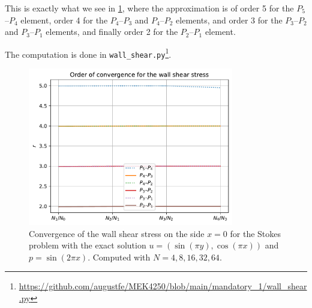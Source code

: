 \begin{solution}{6.7}
    This is exactly what we see in \cref{fig:wall_shear_stress}, where the approximation is of order 5 for the $P_5$--$P_4$ element, order 4 for the $P_4$--$P_3$ and $P_4$--$P_2$ elements, and order 3 for the $P_3$--$P_2$ and $P_3$--$P_1$ elements, and finally order 2 for the $P_2$--$P_1$ element.

    The computation is done in \texttt{wall\_shear.py}\footnote{\url{https://github.com/augustfe/MEK4250/blob/main/mandatory_1/wall_shear.py}}.

    \begin{figure}[htbp]
        \centering
        \includegraphics[width=0.8\textwidth]{wall_shear.pdf}
        \caption{Convergence of the wall shear stress on the side $x = 0$ for the Stokes problem with the exact solution $u = (\sin(\pi y), \cos(\pi x))$ and $p = \sin(2 \pi x)$. Computed with $N = 4, 8, 16, 32, 64$.\label{fig:wall_shear_stress}}
    \end{figure}
\end{solution}